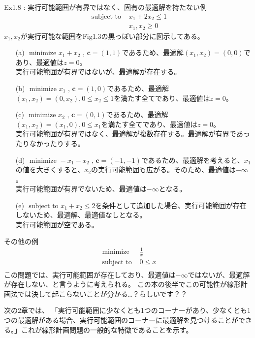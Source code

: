 \documentclass{jsarticle}
\begin{document}
Ex1.8 : 実行可能範囲が有界ではなく、固有の最適解を持たない例
\begin{equation}
\begin{array}{cc}
\text { subject to } & x_{1}+2 x_{2} \leq 1 \\
& x_{1}, x_{2} \geq 0
\end{array}
\end{equation}
$x_1,x_2$が実行可能な範囲をFig1.3の黒っぽい部分に図示してある。\\
\begin{itemize}
  \item[(a)] $\text { minimize }x_{1}+x_{2} $ , $\bm{c}=(1,1)$であるため、最適解$(x_1,x_2)=(0,0)$であり、最適値は$z=0$。\\
実行可能範囲が有界ではないが、最適解が存在する。
  \item[(b)] $\text { minimize }x_{1} $ , $\bm{c}=(1,0)$であるため、最適解$(x_1,x_2)=(0,x_2),0 \leq x_{2} \leq 1$を満たす全てであり、最適値は$z=0$。
  \item[(c)] $\text { minimize }x_{2} $ , $\bm{c}=(0,1)$であるため、最適解$(x_1,x_2)=(x_1,0),0 \leq x_{1} $を満たす全てであり、最適値は$z=0$。\\
実行可能範囲が有界ではなく、最適解が複数存在する。最適解が有界であったりなかったりする。
  \item[(d)] $\text { minimize }-x_{1}-x_{2} $ , $\bm{c}=(-1,-1)$であるため、最適解を考えると、$x_1$の値を大きくすると、$x_2$の実行可能範囲も広がる。そのため、最適値は$-\infty$。\\
実行可能範囲が有界でないため、最適値は$-\infty$となる。
  \item[(e)] $\text { subject to }x_{1}+x_{2} \leq 2$を条件として追加した場合、実行可能範囲が存在しないため、最適解、最適値なしとなる。 \\
実行可能範囲が空である。
\end{itemize}
その他の例
\begin{equation}
\begin{array}{cc}
\text { minimize } & \frac{1}{x}\\
\text { subject to } & 0 \leq x \\
\end{array}
\end{equation}
この問題では、実行可能範囲が存在しており、最適値は$-\infty$ではないが、最適解が存在しない、と言うように考えられる。
この本の後半でこの可能性が線形計画法では決して起こらないことが分かる…？らしいです？？\par

次の2章では、
「実行可能範囲に少なくとも1つのコーナーがあり、少なくとも1つの最適解がある場合、実行可能範囲のコーナーに最適解を見つけることができる。」これが線形計画問題の一般的な特徴であることを示す。
\end{document}
